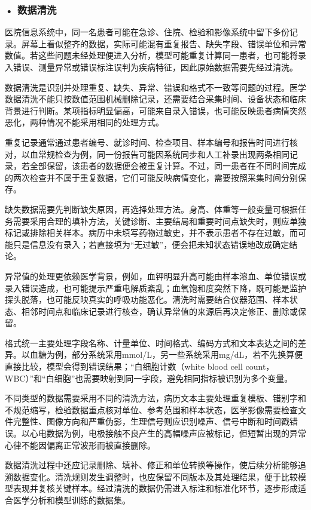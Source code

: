 \subsubsection*{\textbf{• 数据清洗}}

医院信息系统中，同一名患者可能在急诊、住院、检验和影像系统中留下多份记录。屏幕上看似整齐的数据，实际可能混有重复报告、缺失字段、错误单位和异常数值。若这些问题未经处理便进入分析，模型可能重复计算同一患者，也可能将录入错误、测量异常或错误标注误判为疾病特征，因此原始数据需要先经过清洗。

数据清洗是识别并处理重复、缺失、异常、错误和格式不一致等问题的过程。医学数据清洗不能只按数值范围机械删除记录，还需要结合采集时间、设备状态和临床背景进行判断。某项指标明显偏高，可能来自录入错误，也可能反映患者病情突然恶化，两种情况不能采用相同的处理方式。

重复记录通常通过患者编号、就诊时间、检查项目、样本编号和报告时间进行核对，以血常规检查为例，同一份报告可能因系统同步和人工补录出现两条相同记录，若全部保留，该患者的数据便会被重复计算。不过，同一患者在不同时间完成的两次检查并不属于重复数据，它们可能反映病情变化，需要按照采集时间分别保存。

缺失数据需要先判断缺失原因，再选择处理方法。身高、体重等一般变量可根据任务需要采用合理的填补方法，关键诊断、主要结局和重要时间点缺失时，则应单独标记或排除相关样本。病历中未填写药物过敏史，并不表示患者不存在过敏，而可能只是信息没有录入；若直接填为“无过敏”，便会把未知状态错误地改成确定结论。

异常值的处理更依赖医学背景，例如，血钾明显升高可能由样本溶血、单位错误或录入错误造成，也可能提示严重电解质紊乱；血氧饱和度突然下降，既可能是监护探头脱落，也可能反映真实的呼吸功能恶化。清洗时需要结合仪器范围、样本状态、相邻时间点和临床记录进行核查，确认异常值的来源后再决定修正、删除或保留。

格式统一主要处理字段名称、计量单位、时间格式、编码方式和文本表达之间的差异。以血糖为例，部分系统采用mmol/L，另一些系统采用mg/dL，若不先换算便直接比较，模型会得到错误结果；“白细胞计数（white blood cell count，WBC）”和“白细胞”也需要映射到同一字段，避免相同指标被识别为多个变量。

不同类型的数据需要采用不同的清洗方法，病历文本主要处理重复模板、错别字和不规范缩写，检验数据重点核对单位、参考范围和样本状态，医学影像需要检查文件完整性、图像方向和严重伪影，生理信号则应识别噪声、信号中断和时间戳错误。以心电数据为例，电极接触不良产生的高幅噪声应被标记，但短暂出现的异常心律不能因偏离正常波形而被直接删除。

数据清洗过程中还应记录删除、填补、修正和单位转换等操作，使后续分析能够追溯数据变化。清洗规则发生调整时，也应保留不同版本及其处理结果，便于比较模型表现并复核关键样本。经过清洗的数据仍需进入标注和标准化环节，逐步形成适合医学分析和模型训练的数据集。

